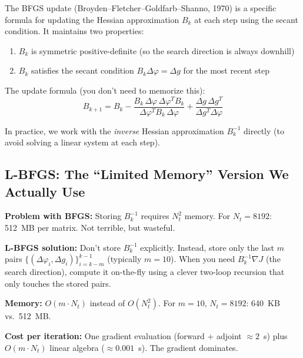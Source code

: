 \documentclass[12pt,a4paper]{article}
\begin{document}
The BFGS update (Broyden--Fletcher--Goldfarb--Shanno, 1970) is a specific formula for updating the Hessian approximation $B_k$ at each step using the secant condition. It maintains two properties:
\begin{enumerate}
    \item $B_k$ is symmetric positive-definite (so the search direction is always downhill)
    \item $B_k$ satisfies the secant condition $B_k \Delta\varphi = \Delta g$ for the most recent step
\end{enumerate}

The update formula (you don't need to memorize this):
\begin{equation}
B_{k+1} = B_k - \frac{B_k\,\Delta\varphi\,\Delta\varphi^T\!B_k}{\Delta\varphi^T\!B_k\,\Delta\varphi} + \frac{\Delta g\,\Delta g^T}{\Delta g^T\Delta\varphi}
\end{equation}

In practice, we work with the \emph{inverse} Hessian approximation $B_k^{-1}$ directly (to avoid solving a linear system at each step).

\subsection{L-BFGS: The ``Limited Memory'' Version We Actually Use}

\textbf{Problem with BFGS:} Storing $B_k^{-1}$ requires $N_t^2$ memory. For $N_t = 8192$: 512~MB per matrix. Not terrible, but wasteful.

\textbf{L-BFGS solution:} Don't store $B_k^{-1}$ explicitly. Instead, store only the last $m$ pairs $\{(\Delta\varphi_i, \Delta g_i)\}_{i=k-m}^{k-1}$ (typically $m = 10$). When you need $B_k^{-1}\nabla J$ (the search direction), compute it on-the-fly using a clever two-loop recursion that only touches the stored pairs.

\textbf{Memory:} $O(m \cdot N_t)$ instead of $O(N_t^2)$. For $m = 10$, $N_t = 8192$: 640~KB vs.\ 512~MB.

\textbf{Cost per iteration:} One gradient evaluation (forward + adjoint $\approx 2$~s) plus $O(m \cdot N_t)$ linear algebra ($\approx 0.001$~s). The gradient dominates.
\end{document}
